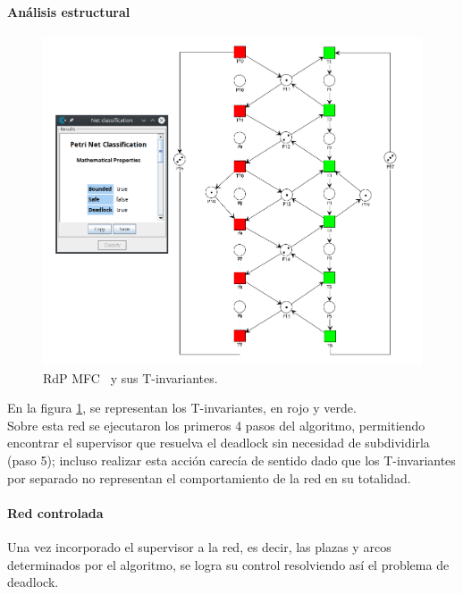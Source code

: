 \paragraph{Análisis estructural}
\hfill
\begin{figure}[H]
	\centering
	\includegraphics[scale=0.45]{Figures/algoritmo3/MFC1.png}
	\caption[RdP MFC \ y sus T-invariantes.]{RdP MFC \footnotemark \ y sus T-invariantes.}
	\label{fig:mfc_T-invariantes} 
 \end{figure} 
 
En la figura \ref{fig:mfc_T-invariantes}, se representan los T-invariantes, en rojo y verde. \\
Sobre esta red se ejecutaron los primeros 4 pasos del algoritmo, permitiendo encontrar el supervisor que resuelva el deadlock sin necesidad de subdividirla (paso 5); incluso realizar esta acción carecía de sentido dado que los T-invariantes por separado no representan el comportamiento de la red en su totalidad.\\

\paragraph{Red controlada}
\hfill \break
Una vez incorporado el supervisor a la red, es decir, las plazas y arcos determinados por el algoritmo, se logra su control resolviendo así el problema de deadlock.

